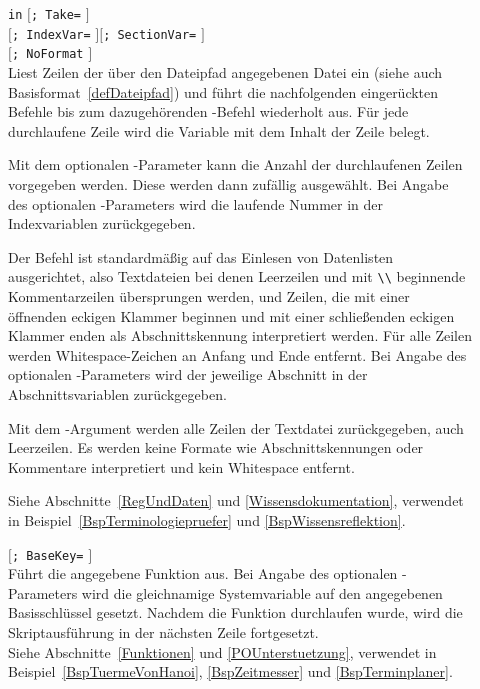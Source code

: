 \begin{description}
\item[]  \verb|in|  $[$\verb|; Take=|  $]$\\
$[$\verb|; IndexVar=|  $][$\verb|; SectionVar=|  $]$\\
$[$\verb|; NoFormat| $]$\\
Liest Zeilen der über den Dateipfad angegebenen Datei ein (siehe auch Basisformat~\ref{defDateipfad}) und führt die nachfolgenden eingerückten Befehle bis zum dazugehörenden -Befehl wiederholt aus. Für jede durchlaufene Zeile wird die Variable mit dem Inhalt der Zeile belegt.\par
Mit dem optionalen -Parameter kann die Anzahl der durchlaufenen Zeilen vorgegeben werden. Diese werden dann zufällig ausgewählt. Bei Angabe des optionalen -Parameters wird die laufende Nummer in der Indexvariablen zurückgegeben.\par
Der Befehl ist standardmäßig auf das Einlesen von Datenlisten ausgerichtet, also Textdateien bei denen Leerzeilen und mit \verb|\\| beginnende Kommentarzeilen übersprungen werden, und Zeilen, die mit einer öffnenden eckigen Klammer beginnen und mit einer schließenden eckigen Klammer enden als Abschnittskennung interpretiert werden. Für alle Zeilen werden Whitespace-Zeichen an Anfang und Ende entfernt. Bei Angabe des optionalen -Parameters wird der jeweilige Abschnitt in der Abschnittsvariablen zurückgegeben.\par
Mit dem -Argument werden alle Zeilen der Textdatei zurückgegeben, auch Leerzeilen. Es werden keine Formate wie Abschnittskennungen oder Kommentare interpretiert und kein Whitespace entfernt.

Siehe Abschnitte~\ref{RegUndDaten} und \ref{Wissensdokumentation}, verwendet in Beispiel~\ref{BspTerminologiepruefer} und \ref{BspWissensreflektion}.

\item[]   $[$\verb|; BaseKey=| $]$\\
Führt die angegebene Funktion aus. Bei Angabe des optionalen -Pa\-ra\-me\-ters wird die gleichnamige Systemvariable auf den angegebenen Basisschlüssel gesetzt. Nachdem die Funktion durchlaufen wurde, wird die Skriptausführung in der nächsten Zeile fortgesetzt.\\
Siehe Abschnitte~\ref{Funktionen} und \ref{POUnterstuetzung}, verwendet in Beispiel~\ref{BspTuermeVonHanoi}, \ref{BspZeitmesser} und \ref{BspTerminplaner}.


\end{description}
